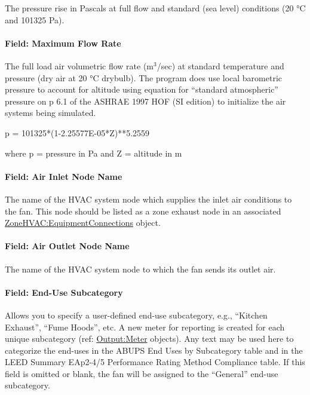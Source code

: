 The pressure rise in Pascals at full flow and standard (sea level) conditions (20 °C and 101325 Pa).

\paragraph{Field: Maximum Flow Rate}\label{field-maximum-flow-rate-3}

The full load air volumetric flow rate (m\(^{3}\)/sec) at standard temperature and pressure (dry air at 20 °C drybulb). The program does use local barometric pressure to account for altitude using equation for ``standard atmospheric'' pressure on p 6.1 of the ASHRAE 1997 HOF (SI edition) to initialize the air systems being simulated.

p = 101325*(1-2.25577E-05*Z)**5.2559

where p = pressure in Pa and Z = altitude in m

\paragraph{Field: Air Inlet Node Name}\label{field-air-inlet-node-name-3-000}

The name of the HVAC system node which supplies the inlet air conditions to the fan. This node should be listed as a zone exhaust node in an associated \hyperref[zonehvacequipmentconnections]{ZoneHVAC:EquipmentConnections} object.

\paragraph{Field: Air Outlet Node Name}\label{field-air-outlet-node-name-3-000}

The name of the HVAC system node to which the fan sends its outlet air.

\paragraph{Field: End-Use Subcategory}\label{field-end-use-subcategory-3}

Allows you to specify a user-defined end-use subcategory, e.g., ``Kitchen Exhaust'', ``Fume Hoods'', etc. A new meter for reporting is created for each unique subcategory (ref: \hyperref[outputmeter-and-outputmetermeterfileonly]{Output:Meter} objects). Any text may be used here to categorize the end-uses in the ABUPS End Uses by Subcategory table and in the LEED Summary EAp2-4/5 Performance Rating Method Compliance table. If this field is omitted or blank, the fan will be assigned to the ``General'' end-use subcategory.

